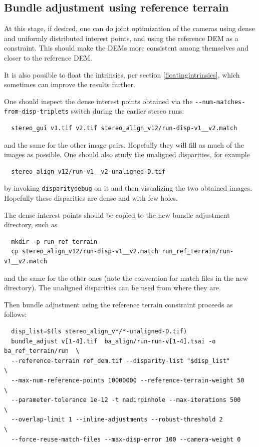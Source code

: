 \subsection{Bundle adjustment using reference terrain}

At this stage, if desired, one can do joint optimization of the cameras using dense
and uniformly distributed interest points, and using the reference DEM as a constraint.
This should make the DEMs more consistent among themselves and closer to the reference DEM.

It is also possible to float the intrinsics, per section \ref{floatingintrinsics},
which sometimes can improve the results further. 

One should inspect the dense interest points obtained via the
\texttt{-\/-num-matches-from-disp-triplets} switch during the earlier stereo
runs:

\begin{verbatim}
  stereo_gui v1.tif v2.tif stereo_align_v12/run-disp-v1__v2.match
\end{verbatim}
and the same for the other image pairs. Hopefully they will fill as much
of the images as possible. One should also study the unaligned disparities,
for example
\begin{verbatim}
  stereo_align_v12/run-v1__v2-unaligned-D.tif
\end{verbatim}
by invoking \texttt{disparitydebug} on it and then visualizing the two
obtained images. Hopefully these disparities are dense and with few holes. 

The dense interest points should be copied to the new bundle adjustment directory, such as
\begin{verbatim}
  mkdir -p run_ref_terrain
  cp stereo_align_v12/run-disp-v1__v2.match run_ref_terrain/run-v1__v2.match
\end{verbatim}

and the same for the other ones (note the convention for match files in the new directory).
The unaligned disparities can be used from where they are. 

Then bundle adjustment using the reference terrain constraint proceeds as follows:
\begin{verbatim}
  disp_list=$(ls stereo_align_v*/*-unaligned-D.tif)
  bundle_adjust v[1-4].tif  ba_align/run-run-v[1-4].tsai -o ba_ref_terrain/run  \
  --reference-terrain ref_dem.tif --disparity-list "$disp_list"                 \
  --max-num-reference-points 10000000 --reference-terrain-weight 50             \ 
  --parameter-tolerance 1e-12 -t nadirpinhole --max-iterations 500              \
  --overlap-limit 1 --inline-adjustments --robust-threshold 2                   \
  --force-reuse-match-files --max-disp-error 100 --camera-weight 0
\end{verbatim}

